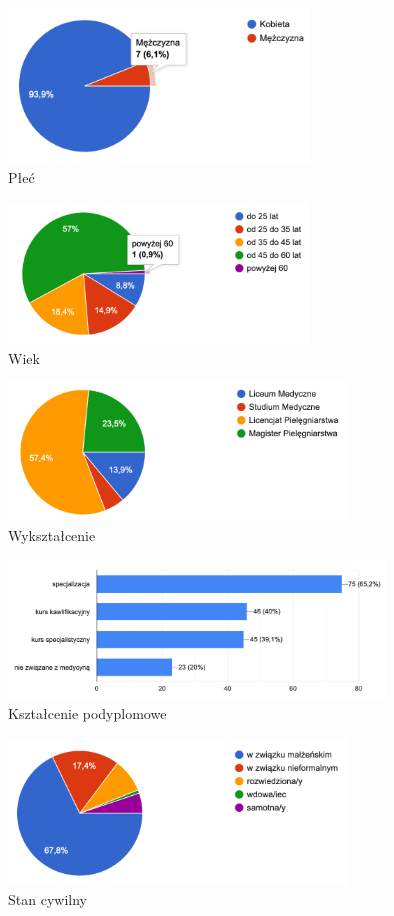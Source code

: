 
\begin{figure}
\includegraphics[width=8cm]{char_gr_bad/plec00}
\caption{Płeć}
\end{figure}

\begin{figure}
\includegraphics[width=8cm]{char_gr_bad/wiek00}
\caption{Wiek}
\end{figure}

\begin{figure}
\includegraphics[width=9cm]{char_gr_bad/wyksztalc00}
\caption{Wykształcenie}
\end{figure}

\begin{figure}
\includegraphics[width=10cm]{char_gr_bad/podyplom00}
\caption{Kształcenie podyplomowe}
\end{figure}

\begin{figure}
\includegraphics[width=9cm]{char_gr_bad/cyw00}
\caption{Stan cywilny}
\end{figure}

